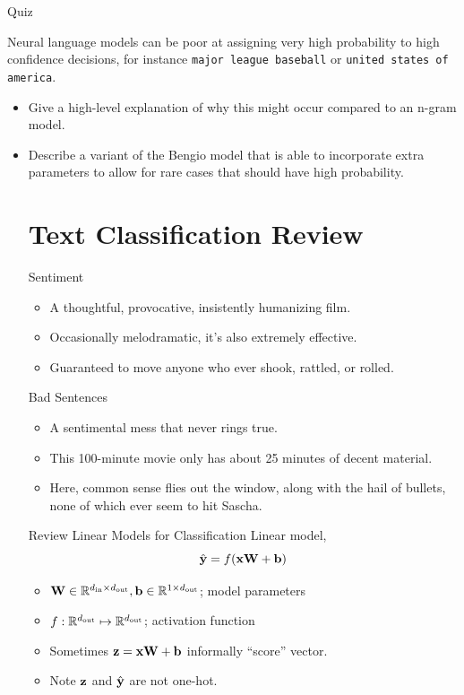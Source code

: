 \documentclass{beamer}
\begin{document}
\begin{frame}{Quiz}

Neural language models can be poor at assigning very high probability
to high confidence decisions, for instance \texttt{major league baseball}
or \texttt{united states of america}. 

\air 

\begin{itemize}
\item Give a high-level explanation of why this might occur compared to an n-gram 
model.
\item  Describe a variant of the Bengio model that is able to incorporate extra parameters 
to allow for rare cases that should have high probability.  



\section{Text Classification Review}


\begin{frame}{Sentiment}
  \begin{itemize}
  \item   A thoughtful, provocative, insistently humanizing film. 
  \item   Occasionally melodramatic, it's also extremely effective.
    \item   Guaranteed to move anyone who ever shook, rattled, or rolled.   
  \end{itemize}

  \alert{Bad Sentences}
  \begin{itemize}
  \item A sentimental mess that never rings true.  
  \item This 100-minute movie only has about 25 minutes of decent material.
  \item Here, common sense flies out the window, along with the hail of
    bullets, none of which ever seem to hit Sascha.
  \end{itemize}
\end{frame}



\begin{frame}{Review Linear Models for Classification}
  Linear model,
  \[\hat{\mathbf{y}} = f(\mathbf{x} \mathbf{W} + \mathbf{b})\]
  \begin{itemize}
  \item $\mathbf{W} \in \mathbb{R}^{{d_{\mathrm{in}}} \times {d_{\mathrm{out}}}}, \mathbf{b} \in \mathbb{R}^{1 \times {d_{\mathrm{out}}}}$; model parameters
  \item $f: \mathbb{R}^{{d_{\mathrm{out}}}} \mapsto \mathbb{R}^{{d_{\mathrm{out}}}}$; activation function
  \item Sometimes $\mathbf{z} = \mathbf{x} \mathbf{W} + \mathbf{b}$ informally ``score'' vector.
  \item Note $\mathbf{z}$ and $\hat{\mathbf{y}}$ are not one-hot.
  \end{itemize}


\end{frame}
\end{itemize}
\end{frame}
\end{document}
